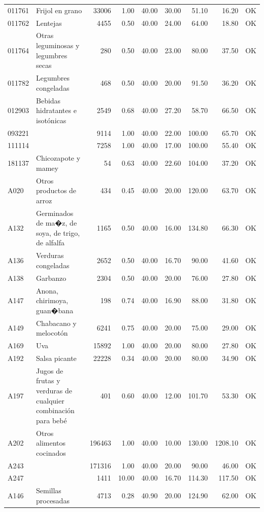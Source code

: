 \begin{table}[ht]
\begin{tabular}{llrrrrrrl}
  011761 & Frijol en grano & 33006 & 1.00 & 40.00 & 30.00 & 51.10 & 16.20 & OK \\ 
  011762 & Lentejas & 4455 & 0.50 & 40.00 & 24.00 & 64.00 & 18.80 & OK \\ 
  011764 & Otras leguminosas y legumbres secas & 280 & 0.50 & 40.00 & 23.00 & 80.00 & 37.50 & OK \\ 
  011782 & Legumbres congeladas & 468 & 0.50 & 40.00 & 20.00 & 91.50 & 36.20 & OK \\ 
  012903 & Bebidas hidratantes e isotónicas & 2549 & 0.68 & 40.00 & 27.20 & 58.70 & 66.50 & OK \\ 
  093221 &  & 9114 & 1.00 & 40.00 & 22.00 & 100.00 & 65.70 & OK \\ 
  111114 &  & 7258 & 1.00 & 40.00 & 17.00 & 100.00 & 55.40 & OK \\ 
  181137 & Chicozapote y mamey &  54 & 0.63 & 40.00 & 22.60 & 104.00 & 37.20 & OK \\ 
  A020 & Otros productos de arroz & 434 & 0.45 & 40.00 & 20.00 & 120.00 & 63.70 & OK \\ 
  A132 & Germinados de ma�z, de soya, de trigo, de alfalfa & 1165 & 0.50 & 40.00 & 16.00 & 134.80 & 66.30 & OK \\ 
  A136 & Verduras congeladas & 2652 & 0.50 & 40.00 & 16.70 & 90.00 & 41.60 & OK \\ 
  A138 & Garbanzo & 2304 & 0.50 & 40.00 & 20.00 & 76.00 & 27.80 & OK \\ 
  A147 & Anona, chirimoya, guan�bana & 198 & 0.74 & 40.00 & 16.90 & 88.00 & 31.80 & OK \\ 
  A149 & Chabacano y melocotón & 6241 & 0.75 & 40.00 & 20.00 & 75.00 & 29.00 & OK \\ 
  A169 & Uva & 15892 & 1.00 & 40.00 & 20.00 & 80.00 & 27.80 & OK \\ 
  A192 & Salsa picante & 22228 & 0.34 & 40.00 & 20.00 & 80.00 & 34.90 & OK \\ 
  A197 & Jugos de frutas y verduras de cualquier combinación para bebé & 401 & 0.60 & 40.00 & 12.00 & 101.70 & 53.30 & OK \\ 
  A202 & Otros alimentos cocinados & 196463 & 1.00 & 40.00 & 10.00 & 130.00 & 1208.10 & OK \\ 
  A243 &  & 171316 & 1.00 & 40.00 & 20.00 & 90.00 & 46.00 & OK \\ 
  A247 &  & 1411 & 10.00 & 40.00 & 16.70 & 114.30 & 117.50 & OK \\ 
  A146 & Semillas procesadas & 4713 & 0.28 & 40.90 & 20.00 & 124.90 & 62.00 & OK \\ 

\end{tabular}
\end{table}
